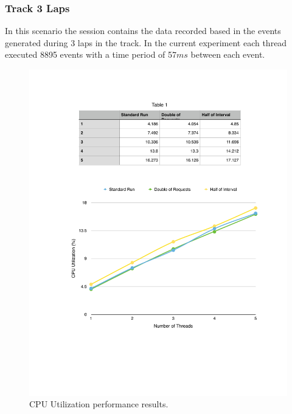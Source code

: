 \subsubsection{Track 3 Laps}
\label{subs:eval_exp_data_3laps}
In this scenario the session contains the data recorded based in the events generated during 3 laps
in the track. In the current experiment each thread executed 8895 events with a time period of 57$ms$
between each event.\\

\begin{figure}[ht!]
  \centering
  \includegraphics[width=.75\textwidth]{./images/cpu_3_lap}
  \caption{CPU Utilization performance results.}
  \label{fig:eval_3laps_cpu}
\end{figure}

